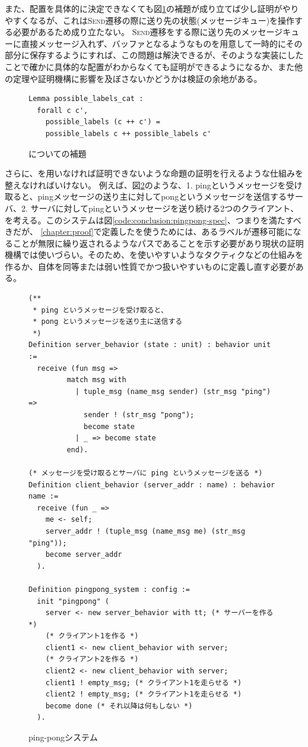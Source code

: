 また、配置を具体的に決定できなくても図\ref{code:conclusion:possible-labels-cat}の補題が成り立てば少し証明がやりやすくなるが、これは\textsc{Send}遷移の際に送り先の状態(メッセージキュー)を操作する必要があるため成り立たない。
\textsc{Send}遷移をする際に送り先のメッセージキューに直接メッセージ入れず、バッファとなるようなものを用意して一時的にその部分に保存するようにすれば、この問題は解決できるが、そのような実装にしたことで確かに具体的な配置がわからなくても証明ができるようになるか、また他の定理や証明機構に影響を及ぼさないかどうかは検証の余地がある。


\begin{figure}[tp]
\begin{lstlisting}
Lemma possible_labels_cat :
  forall c c',
    possible_labels (c ++ c') =
    possible_labels c ++ possible_labels c'
\end{lstlisting}
\label{code:conclusion:possible-labels-cat}
\caption{についての補題}
\end{figure}


さらに、\fairness を用いなければ証明できないような命題の証明を行えるような仕組みを整えなければいけない。
例えば、図\ref{code:conclusion:pingpong}のような、1. pingというメッセージを受け取ると、pingメッセージの送り主に対してpongというメッセージを送信するサーバ、2. サーバに対してpingというメッセージを送り続ける2つのクライアント、を考える。このシステムは図\ref{code:conclusion:pingpong-spec}、つまりを満たすべきだが、
\ref{chapter:proof}で定義したを使うためには、あるラベルが遷移可能になることが無限に繰り返されるようなパスであることを示す必要があり現状の証明機構では使いづらい。そのため、を使いやすいようなタクティクなどの仕組みを作るか、自体を同等または弱い性質でかつ扱いやすいものに定義し直す必要がある。

\begin{figure}[tp]
  \begin{lstlisting}
(**
 * ping というメッセージを受け取ると、
 * pong というメッセージを送り主に送信する
 *)
Definition server_behavior (state : unit) : behavior unit :=
  receive (fun msg =>
         match msg with
           | tuple_msg (name_msg sender) (str_msg "ping") =>
             sender ! (str_msg "pong");
             become state
           | _ => become state
         end).

(* メッセージを受け取るとサーバに ping というメッセージを送る *)
Definition client_behavior (server_addr : name) : behavior name :=
  receive (fun _ =>
    me <- self;
    server_addr ! (tuple_msg (name_msg me) (str_msg "ping"));
    become server_addr
  ).

Definition pingpong_system : config :=
  init "pingpong" (
    server <- new server_behavior with tt; (* サーバーを作る *)
    (* クライアント1を作る *)
    client1 <- new client_behavior with server;
    (* クライアント2を作る *)
    client2 <- new client_behavior with server;
    client1 ! empty_msg; (* クライアント1を走らせる *)
    client2 ! empty_msg; (* クライアント1を走らせる *)
    become done (* それ以降は何もしない *)
  ).
  \end{lstlisting}
  \label{code:conclusion:pingpong}
  \caption{ping-pongシステム}
\end{figure}

